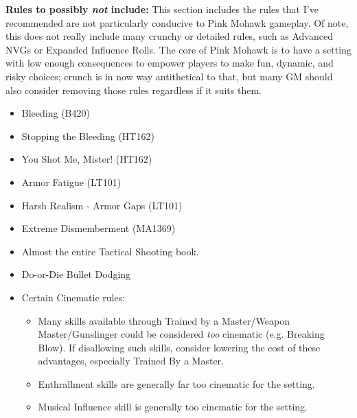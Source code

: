 \begin{multicols}{2}
	\textbf{Rules to possibly \textit{not} include:}
	This section includes the rules that I've recommended are not particularly conducive to Pink Mohawk gameplay. Of note, this does not really include many crunchy or detailed rules, such as Advanced NVGs or Expanded Influence Rolls. The core of Pink Mohawk is to have a setting with low enough consequences to empower players to make fun, dynamic, and risky choices; crunch is in now way antithetical to that, but many GM should also consider removing those rules regardless if it suits them.
	\begin{itemize}
		\itemsep 0pt
		\item Bleeding (B420)
		\item Stopping the Bleeding (HT162)
		\item You Shot Me, Mister! (HT162)
		\item Armor Fatigue (LT101)
		\item Harsh Realism - Armor Gaps (LT101)
		\item Extreme Dismemberment (MA1369)
		\item Almost the entire Tactical Shooting book.
		\item Do-or-Die Bullet Dodging
		\item Certain Cinematic rules:
		\begin{itemize}
			\itemsep 0pt
			\item Many skills available through Trained by a Master/Weapon Master/Gunslinger could be considered \textit{too} cinematic (e.g. Breaking Blow). If disallowing such skills, consider lowering the cost of these advantages, especially Trained By a Master.
			\item Enthrallment skills are generally far too cinematic for the setting.
			\item Musical Influence skill is generally too cinematic for the setting.
		\end{itemize}
	\end{itemize}
	

\end{multicols}
